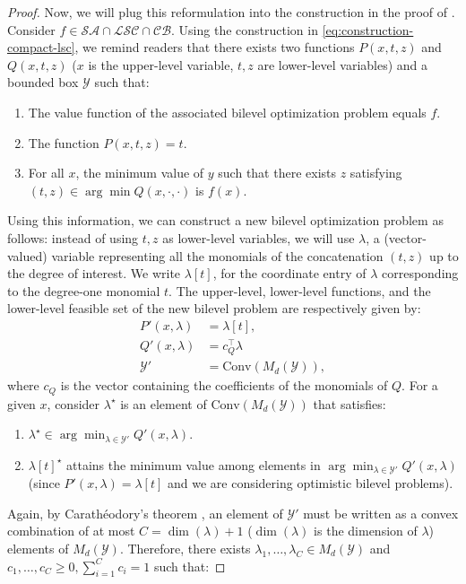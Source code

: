 \documentclass{article}
\newcommand*{\cY}{\mathcal{Y}}
\newcommand{\argmin}{\arg\min}
\newcommand{\SA}{\mathcal{SA}}
\newcommand{\LSC}{\mathcal{LSC}}
\newcommand{\BC}{\mathcal{CB}}
\newcommand{\conv}[1]{\text{Conv}(#1)}
\theoremstyle{plain}
\theoremstyle{definition}
\begin{document}
\begin{proof}
    Now, we will plug this reformulation into the construction in the proof of . Consider $f \in \SA \cap \LSC \cap \BC$. Using the construction in \eqref{eq:construction-compact-lsc}, we remind readers that there exists two functions $P(x,t,z)$ and $Q(x,t,z)$ ($x$ is the upper-level variable, $t,z$ are lower-level variables) and a bounded box $\cY$ such that:
    \begin{enumerate}
        \item The value function of the associated bilevel optimization problem equals $f$.
        \item The function $P(x,t,z) = t$.
        \item For all $x$, the minimum value of $y$ such that there exists $z$ satisfying $(t,z) \in \argmin Q(x, \cdot, \cdot)$ is $f(x)$.
    \end{enumerate}
    Using this information, we can construct a new bilevel optimization problem as follows: instead of using $t,z$ as lower-level variables, we will use $\lambda$, a (vector-valued) variable representing all the monomials of the concatenation $(t,z)$ up to the degree of interest. We write $\lambda[t]$, for the coordinate entry of $\lambda$ corresponding to the degree-one monomial $t$. The upper-level, lower-level functions, and the lower-level feasible set of the new bilevel problem are respectively given by:
    \begin{equation*}
        \begin{aligned}
            P'(x,\lambda) &= \lambda[t], \\
            Q'(x,\lambda) &= c_Q^\top \lambda\\
            \cY' &= \conv{M_d(\cY)},
        \end{aligned}
    \end{equation*}
    where $c_Q$ is the vector containing the coefficients of the monomials of $Q$. For a given $x$, consider $\lambda^\star$ is an element of $\conv{M_d(\cY)}$ that satisfies:
    \begin{enumerate}
        \item $\lambda^\star \in \argmin_{\lambda \in \cY'} Q'(x, \lambda)$.
        \item $\lambda[t]^\star$ attains the minimum value among elements in $\argmin_{\lambda \in \cY'} Q'(x, \lambda)$ (since $P'(x,\lambda) = \lambda[t]$ and we are considering optimistic bilevel problems).
    \end{enumerate}
    Again, by Carathéodory's theorem \cite[Theorem $0.0.1$]{vershyninHighdimensionalProbabilityIntroduction2018}, an element of $\cY'$ must be written as a convex combination of at most $C = \dim(\lambda) + 1$ ($\dim(\lambda)$ is the dimension of $\lambda$) elements of $M_d(\cY)$. Therefore, there exists $\lambda_1, \ldots, \lambda_C \in M_d(\cY)$ and $c_1, \ldots, c_C \geq 0, \sum_{i = 1}^C c_i = 1$ such that:

\end{proof}
\end{document}
